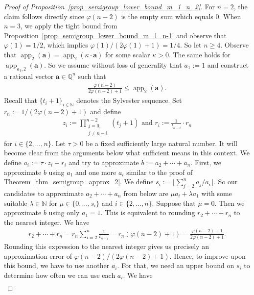 \documentclass[pdflatex]{sn-jnl}
\DeclareMathOperator{\app}{app}
\newcommand{\Q}{\mathbb{Q}}
\newcommand{\N}{\mathbb{N}}
\newcommand{\ba}{\bm{a}}
\theoremstyle{thmstyleone}%
\theoremstyle{thmstyletwo}%
\theoremstyle{thmstylethree}%
\begin{document}
	\begin{proof}[Proof of Proposition~\ref{prop_semigroup_lower_bound_m_1_n_2}]
		For $n = 2$, the claim follows directly since $\varphi(n-2)$ is the empty sum which equals $0$. When $n=3$, we apply the tight bound from Proposition~\ref{prop_semigroup_lower_bound_m_1_n-1} and observe that $\varphi(1) = 1/2$, which implies $\varphi(1)/(2\varphi(1) + 1) = 1/4$. So let $n\geq 4$. 
		Observe that $\app_{2}(\ba) = \app_{2}(\kappa\cdot\ba)$ for some scalar $\kappa > 0$. The same holds for $\app_{a_1,2}(\ba)$. So we assume without loss of generality that $a_1 := 1$ and construct a rational vector $\ba\in\Q^n$ such that 
		\begin{align*}
			\frac{\varphi(n-2)}{2\varphi(n-2) + 1}\leq \app_2(\ba).
		\end{align*}
		Recall that $\lbrace t_i + 1\rbrace_{i\in \N}$ denotes the Sylvester sequence. Set $r_n := 1/(2\varphi(n-2) + 1)$ and define 
		\begin{align*}
			z_i := \prod_{\substack{j = 0, \\ j \neq n - i}}^{n-2}(t_j + 1) \text{ and } r_i := \frac{1}{t_{n-i}}\cdot r_n
		\end{align*}
		for $i\in\lbrace 2,\ldots,n\rbrace$. Let $\tau > 0$ be a fixed sufficiently large natural number. It will become clear from the arguments below what sufficient means in this context. We define $a_i := \tau\cdot z_i + r_i$ and try to approximate $b := a_2 + \cdots + a_n$. First, we approximate $b$ using $a_1$ and one more $a_i$ similar to the proof of Theorem~\ref{thm_semigroup_approx_2}. We define $s_i := \lfloor \sum_{j=2}^n a_j/a_i\rfloor$. So our candidates to approximate $a_2 + \cdots + a_n$ from below are $\mu a_i + \lambda a_1$ with some suitable $\lambda\in \N$ for $\mu\in\lbrace 0,\ldots, s_i\rbrace$ and $i\in\lbrace 2,\ldots, n\rbrace$. 
		Suppose that $\mu=0$. Then we approximate $b$ using only $a_1 = 1$. This is equivalent to rounding $r_2+\cdots+r_n$ to the nearest integer. We have
		\begin{align*}
			r_2+\cdots+r_n = r_n \sum_{i = 2}^{n}\frac{1}{t_{n-i}} = r_n(\varphi(n-2) + 1) = \frac{\varphi(n-2) + 1}{2\varphi(n-2) + 1}.
		\end{align*}
		Rounding this expression to the nearest integer gives us precisely an approximation error of  $\varphi(n-2)/(2\varphi(n-2) + 1)$. Hence, to improve upon this bound, we have to use another $a_i$. For that, we need an upper bound on $s_i$ to determine how often we can use each $a_i$. We have 
		\begin{align*}

\end{align*}
\end{proof}
\end{document}
